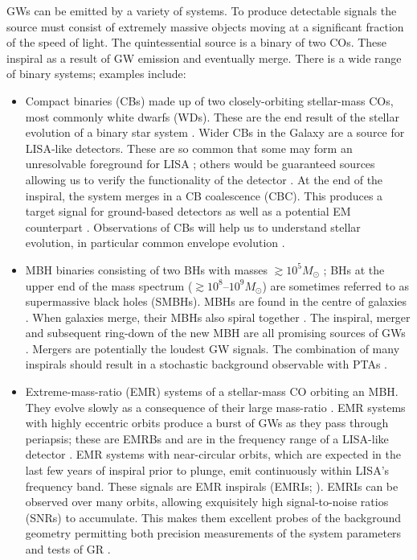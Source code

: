 GWs can be emitted by a variety of systems. To produce detectable signals the source must consist of extremely massive objects moving at a significant fraction of the speed of light. The quintessential source is a binary of two COs. These inspiral as a result of GW emission and eventually merge. There is a wide range of binary systems; examples include:
\begin{itemize}
\item Compact binaries (CBs) made up of two closely-orbiting stellar-mass COs, most commonly white dwarfs (WDs). These are the end result of the stellar evolution of a binary star system \citep{Postnov2006}. Wider CBs in the Galaxy are a source for LISA-like detectors. These are so common that some may form an unresolvable foreground for LISA \citep{Nelemans2009}; others would be guaranteed sources allowing us to verify the functionality of the detector \citep{Stroeer2006}. At the end of the inspiral, the system merges in a CB coalescence (CBC). This produces a target signal for ground-based detectors \citep{Abadie2010a} as well as a potential EM counterpart \citep[e.g.,][]{Webbink1984,Iben1984Jr,Metzger2010,Rezzolla2011,Nakar2011}. Observations of CBs will help us to understand stellar evolution, in particular common envelope evolution \citep{Ivanova2013}.

\item MBH binaries consisting of two BHs with masses $\gtrsim 10^5 M_\odot$ \citep{Sesana2013b}; BHs at the upper end of the mass spectrum ($\gtrsim10^8$--$10^9 M_\odot$) are sometimes referred to as supermassive black holes (SMBHs). MBHs are found in the centre of galaxies \citep{Lynden-Bell1969,Ferrarese2005}. When galaxies merge, their MBHs also spiral together \citep{Volonteri2003,Schnittman2013}. The inspiral, merger and subsequent ring-down of the new MBH are all promising sources of GWs \citep{Flanagan1998}. Mergers are potentially the loudest GW signals. The combination of many inspirals should result in a stochastic background observable with PTAs \citep{Sesana2008}.

\item Extreme-mass-ratio (EMR) systems of a stellar-mass CO orbiting an MBH. They evolve slowly as a consequence of their large mass-ratio \citep{Glampedakis2005,Barack2009}. EMR systems with highly eccentric orbits produce a burst of GWs as they pass through periapsis; these are EMRBs and are in the frequency range of a LISA-like detector \citep{Rubbo2006}. EMR systems with near-circular orbits, which are expected in the last few years of inspiral prior to plunge, emit continuously within LISA's frequency band. These signals are EMR inspirals (EMRIs; \citealt{Amaro-Seoane2007}). EMRIs can be observed over many orbits, allowing exquisitely high signal-to-noise ratios (SNRs) to accumulate. This makes them excellent probes of the background geometry permitting both precision measurements of the system parameters and tests of GR \citep[e.g.,][]{Babak2010}.
\end{itemize}
